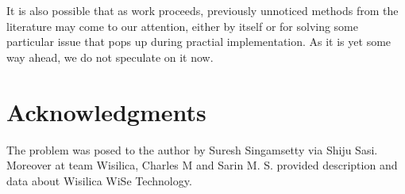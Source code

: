 \documentclass[fleqn,a4paper]{SelfArx}
\begin{document}
It is also possible that as work proceeds, previously unnoticed methods from the literature may come to our attention, either by
itself or for solving some particular issue that pops up during practial implementation. As it is yet some way ahead, we do not 
speculate on it now.

\section*{Acknowledgments} 

The problem was posed to the author by Suresh Singamsetty via Shiju Sasi. Moreover at team Wisilica, Charles M and Sarin M. S.
provided description and data about Wisilica WiSe Technology.





\end{document}
